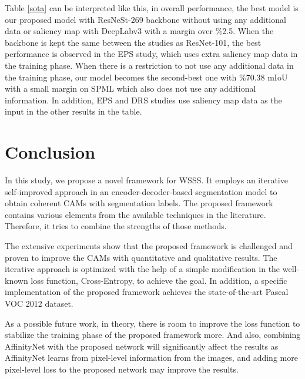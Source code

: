 \documentclass[sn-mathphys]{sn-jnl}
\theoremstyle{thmstyleone}
\theoremstyle{thmstyletwo}\newtheorem{example}{Example}\newtheorem{remark}{Remark}
\theoremstyle{thmstylethree}\newtheorem{definition}{Definition}
\begin{document}
Table \ref{sota} can be interpreted like this, in overall performance, the best model is our proposed model with ResNeSt-269 backbone without using any additional data or saliency map with DeepLabv3 with a margin over \%2.5. When the backbone is kept the same between the studies as ResNet-101, the best performance is observed in the EPS study, which uses extra saliency map data in the training phase. When there is a restriction to not use any additional data in the training phase, our model becomes the second-best one with \%70.38 mIoU with a small margin on SPML which also does not use any additional information. In addition, EPS and DRS studies use saliency map data as the input in the other results in the table.



\section{Conclusion}\label{conclusion}
In this study, we propose a novel framework for WSSS. It employs an iterative self-improved approach in an encoder-decoder-based segmentation model to obtain coherent CAMs with segmentation labels. The proposed framework contains various elements from the available techniques in the literature. Therefore, it tries to combine the strengths of those methods.     

The extensive experiments show that the proposed framework is challenged and proven to improve the CAMs with quantitative and qualitative results. The iterative approach is optimized with the help of a simple modification in the well-known loss function, Cross-Entropy, to achieve the goal. In addition, a specific implementation of the proposed framework achieves the state-of-the-art Pascal VOC 2012 dataset.

As a possible future work, in theory, there is room to improve the loss function to stabilize the training phase of the proposed framework more. And also, combining AffinityNet with the proposed network will significantly affect the results as AffinityNet learns from pixel-level information from the images, and adding more pixel-level loss to the proposed network may improve the results.

\backmatter










\end{document}
